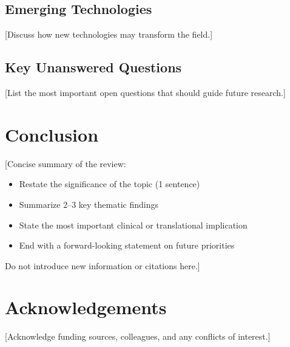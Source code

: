 \documentclass[11pt,a4paper]{article}
\begin{document}
\subsection{Emerging Technologies}
[Discuss how new technologies may transform the field.]

\subsection{Key Unanswered Questions}
[List the most important open questions that should guide future research.]

\section{Conclusion}
[Concise summary of the review:
\begin{itemize}
    \item Restate the significance of the topic (1 sentence)
    \item Summarize 2–3 key thematic findings
    \item State the most important clinical or translational implication
    \item End with a forward-looking statement on future priorities
\end{itemize}

Do not introduce new information or citations here.]

\section*{Acknowledgements}
[Acknowledge funding sources, colleagues, and any conflicts of interest.]



% 


\end{document}
